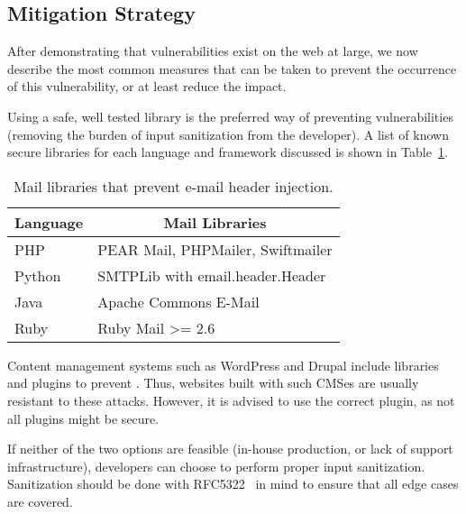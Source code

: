 \subsection{Mitigation Strategy}

\label{disc:mitigation}
After demonstrating that \ehi vulnerabilities exist on the web at large, we now describe the most common measures that can be taken to prevent the occurrence of this vulnerability, or at least reduce the impact.

Using a safe, well tested \email library is the preferred way of
preventing \ehi vulnerabilities (removing the burden of input
sanitization from the developer). A list of known secure libraries for
each language and framework discussed is shown in
Table~\ref{tab:maillib}.

\begin{table}[tbp]
		\centering
		\scriptsize
		\begin{tabular}{|l|l|}
			\hline
			\multicolumn{1}{|c|}{\textbf{Language}} &
			\multicolumn{1}{c|}{\textbf{Mail Libraries}} \\
			\hline
			PHP & {{PEAR Mail\cite{Hagenbuch2016}, PHPMailer\cite{PHPMailer2016}, Swiftmailer\cite{SwiftMailer2016}}}\\
			\hline
			Python & SMTPLib with email.header.Header\\
			\hline
			Java & Apache Commons E-Mail\cite{ACE2016}\\
			\hline
			Ruby & Ruby Mail \textgreater{}= 2.6\cite{RubyMailGem2016}\\
			\hline
		\end{tabular}
		\caption[]{Mail libraries that prevent e-mail header
          injection.}
        
		\label{tab:maillib}
\end{table}

Content management systems such as WordPress and Drupal include
libraries and plugins to prevent \ehi. Thus, websites built with such
CMSes are usually resistant to these attacks. However, it is advised to
use the correct \email plugin, as not all plugins might be secure.

If neither of the two options are feasible (in-house
production, or lack of support infrastructure), developers can
choose to perform proper input sanitization. Sanitization should be
done with RFC5322~\cite{rfc5322} in mind to
ensure that all edge cases are covered.


